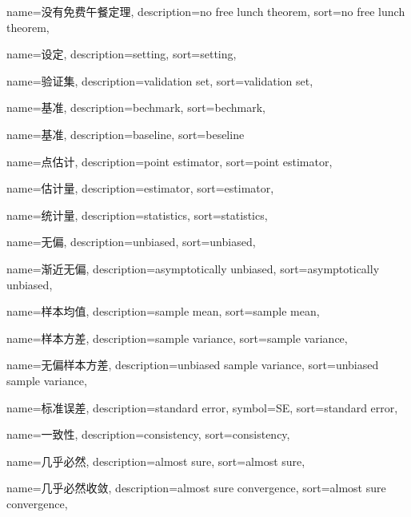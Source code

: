 {
  name=没有免费午餐定理,
  description={no free lunch theorem},
  sort={no free lunch theorem},
}

{
  name=设定,
  description={setting},
  sort={setting},
}

{
  name=验证集,
  description={validation set},
  sort={validation set},
}

{
  name=基准,
  description={bechmark},
  sort={bechmark},
}

{
  name=基准,
  description={baseline},
  sort={beseline}
}

{
  name=点估计,
  description={point estimator},
  sort={point estimator},
}

{
  name=估计量,
  description={estimator},
  sort={estimator},
}

{
  name=统计量,
  description={statistics},
  sort={statistics},
}

{
  name=无偏,
  description={unbiased},
  sort={unbiased},
}

{
  name=渐近无偏,
  description={asymptotically unbiased},
  sort={asymptotically unbiased},
}

{
  name=样本均值, %
  description={sample mean},
  sort={sample mean},
}

{
  name=样本方差, %
  description={sample variance},
  sort={sample variance},
}

{
  name=无偏样本方差, %
  description={unbiased sample variance},
  sort={unbiased sample variance},
}

{
  name=标准误差,
  description={standard error},
  symbol={SE},
  sort={standard error},
}

{
  name=一致性,
  description={consistency},
  sort={consistency},
}

{
  name=几乎必然,
  description={almost sure},
  sort={almost sure},
}

{
  name=几乎必然收敛,
  description={almost sure convergence},
  sort={almost sure convergence},
}

